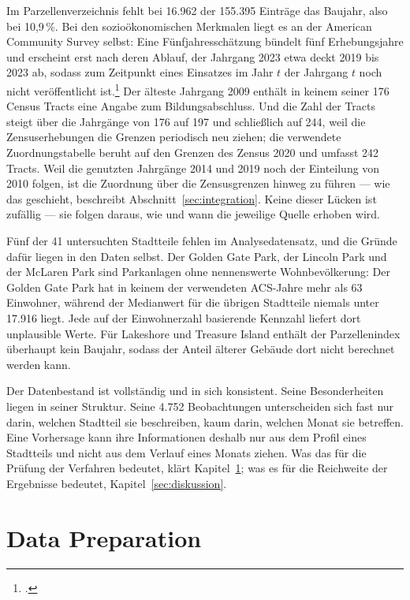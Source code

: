 \documentclass[12pt,a4paper]{article}
\begin{document}
Im Parzellenverzeichnis fehlt bei 16.962 der 155.395 Einträge das Baujahr, also bei 10,9\,\%. Bei den sozioökonomischen Merkmalen liegt es an der American Community Survey selbst: Eine Fünfjahresschätzung bündelt fünf Erhebungsjahre und erscheint erst nach deren Ablauf, der Jahrgang 2023 etwa deckt 2019 bis 2023 ab, sodass zum Zeitpunkt eines Einsatzes im Jahr $t$ der Jahrgang $t$ noch nicht veröffentlicht ist.\footcite[13]{CensusBureau2020} Der älteste Jahrgang 2009 enthält in keinem seiner 176 Census Tracts eine Angabe zum Bildungsabschluss. Und die Zahl der Tracts steigt über die Jahrgänge von 176 auf 197 und schließlich auf 244, weil die Zensuserhebungen die Grenzen periodisch neu ziehen; die verwendete Zuordnungstabelle beruht auf den Grenzen des Zensus 2020 und umfasst 242 Tracts. Weil die genutzten Jahrgänge 2014 und 2019 noch der Einteilung von 2010 folgen, ist die Zuordnung über die Zensusgrenzen hinweg zu führen --- wie das geschieht, beschreibt Abschnitt~\ref{sec:integration}. Keine dieser Lücken ist zufällig --- sie folgen daraus, wie und wann die jeweilige Quelle erhoben wird.

Fünf der 41 untersuchten Stadtteile fehlen im Analysedatensatz, und die Gründe dafür
liegen in den Daten selbst. Der Golden Gate Park, der Lincoln Park und der McLaren Park sind Parkanlagen
ohne nennenswerte Wohnbevölkerung: Der Golden Gate Park hat in keinem der
verwendeten ACS-Jahre mehr als 63 Einwohner, während der Medianwert für die übrigen Stadtteile niemals
unter 17.916 liegt. Jede auf der Einwohnerzahl basierende Kennzahl liefert dort unplausible
Werte. Für Lakeshore und Treasure Island enthält der Parzellenindex überhaupt kein
Baujahr, sodass der Anteil älterer Gebäude dort nicht
berechnet werden kann.

Der Datenbestand ist vollständig und in sich konsistent. Seine Besonderheiten liegen in seiner Struktur. Seine 4.752 Beobachtungen unterscheiden sich fast nur darin, welchen Stadtteil sie beschreiben, kaum darin, welchen Monat sie betreffen. Eine Vorhersage kann ihre Informationen deshalb nur aus dem Profil eines Stadtteils und nicht aus dem Verlauf eines Monats ziehen. Was das für die Prüfung der Verfahren bedeutet, klärt Kapitel~\ref{sec:data-preparation}; was es für die Reichweite der Ergebnisse bedeutet, Kapitel~\ref{sec:diskussion}.

\section{Data Preparation}
\label{sec:data-preparation}
\end{document}
